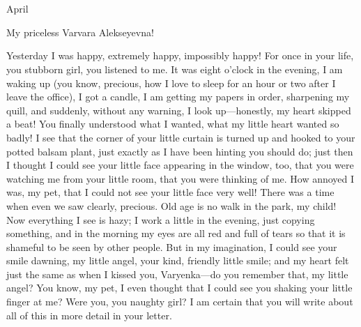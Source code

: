 \chapter*{}


\begin{flushright}
	April 
\end{flushright}

\noindent My priceless Varvara Alekseyevna!

Yesterday I was happy, extremely happy, impossibly happy! For once in your life, you stubborn girl, you listened to me. It was eight o'clock in the evening, I am waking up (you know, precious, how I love to sleep for an hour or two after I leave the office), I got a candle, I am getting my papers in order, sharpening my quill, and suddenly, without any warning, I look up---honestly, my heart skipped a beat! You finally understood what I wanted, what my little heart wanted so badly! I see that the corner of your little curtain is turned up and hooked to your potted balsam plant, just exactly as I have been hinting you should do; just then I thought I could see your little face appearing in the window, too, that you were watching me from your little room, that you were thinking of me. How annoyed I was, my pet, that I could not see your little face very well! There was a time when even we saw clearly, precious. Old age is no walk in the park, my child! Now everything I see is hazy; I work a little in the evening, just copying something, and in the morning my eyes are all red and full of tears so that it is shameful to be seen by other people. But in my imagination, I could see your smile dawning, my little angel, your kind, friendly little smile; and my heart felt just the same as when I kissed you, Varyenka---do you remember that, my little angel? You know, my pet, I even thought that I could see you shaking your little finger at me? Were you, you naughty girl? I am certain that you will write about all of this in more detail in your letter.

